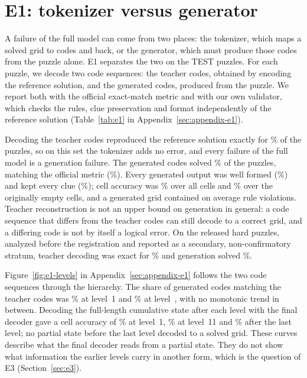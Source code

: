 \section{E1: tokenizer versus generator}
\label{sec:e1}

A failure of the full model can come from two places: the tokenizer, which maps a solved grid to codes and back, or the generator, which must produce those codes from the puzzle alone. E1 separates the two on the  TEST puzzles. For each puzzle, we decode two code sequences: the teacher codes, obtained by encoding the reference solution, and the generated codes, produced from the puzzle. We report both with the official exact-match metric and with our own validator, which checks the rules, clue preservation and format independently of the reference solution (Table~\ref{tab:e1} in Appendix~\ref{sec:appendix-e1}).

Decoding the teacher codes reproduced the reference solution exactly for \% of the puzzles, so on this set the tokenizer adds no error, and every failure of the full model is a generation failure. The generated codes solved \% of the puzzles, matching the official metric (\%). Every generated output was well formed (\%) and kept every clue (\%); cell accuracy was \% over all cells and \% over the originally empty cells, and a generated grid contained on average  rule violations. Teacher reconstruction is not an upper bound on generation in general: a code sequence that differs from the teacher codes can still decode to a correct grid, and a differing code is not by itself a logical error. On the  released hard puzzles, analyzed before the registration and reported as a secondary, non-confirmatory stratum, teacher decoding was exact for \% and generation solved \%.

Figure~\ref{fig:e1-levels} in Appendix~\ref{sec:appendix-e1} follows the two code sequences through the hierarchy. The share of generated codes matching the teacher codes was \% at level~1 and \% at level~, with no monotonic trend in between. Decoding the full-length cumulative state after each level with the final decoder gave a cell accuracy of \% at level~1, \% at level~11 and \% after the last level; no partial state before the last level decoded to a solved grid. These curves describe what the final decoder reads from a partial state. They do not show what information the earlier levels carry in another form, which is the question of E3 (Section~\ref{sec:e3}).
